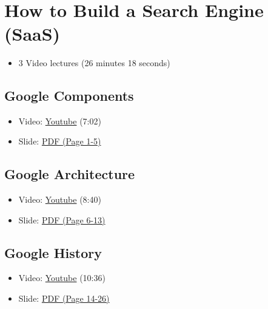 \FILENAME\

\section{How to Build a Search Engine
(SaaS)}\label{how-to-build-a-search-engine-saas}

\begin{itemize}
\item
  3 Video lectures (26 minutes 18 seconds)
\end{itemize}

\subsection{Google Components}\label{google-components}

\begin{itemize}
\item
  Video: \href{https://www.youtube.com/watch?v=IWMcv7HbbPM}{Youtube}
  (7:02)
\item
  Slide:
  \href{https://drive.google.com/open?id=0B88HKpainTSfYWZ0dDlrNThkVms}{PDF
  (Page 1-5)}
\end{itemize}

\subsection{Google Architecture}\label{google-architecture}

\begin{itemize}
\item
  Video: \href{https://www.youtube.com/watch?v=syZHezdbdRY}{Youtube}
  (8:40)
\item
  Slide:
  \href{https://drive.google.com/open?id=0B88HKpainTSfYWZ0dDlrNThkVms}{PDF
  (Page 6-13)}
\end{itemize}

\subsection{Google History}\label{google-history}

\begin{itemize}

\item
  Video: \href{https://www.youtube.com/watch?v=Kg0NK0XUkHw}{Youtube}
  (10:36)
\item
  Slide:
  \href{https://drive.google.com/open?id=0B88HKpainTSfYWZ0dDlrNThkVms}{PDF
  (Page 14-26)}
\end{itemize}
